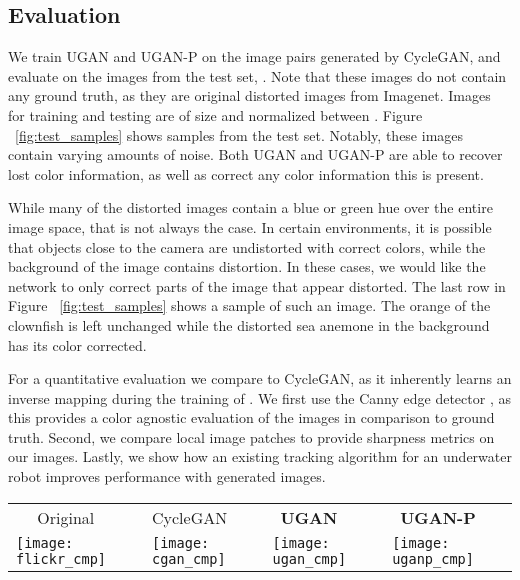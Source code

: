\subsection{Evaluation}
We train UGAN and UGAN-P on the image pairs generated by CycleGAN, and evaluate on the images from the
test set, . Note that these images do not contain any ground truth, as they are original distorted images from
Imagenet. Images for training and testing are of size  and normalized between .
Figure ~\ref{fig:test_samples} shows samples from the test set. Notably, these images contain varying amounts of noise. Both UGAN 
and UGAN-P
are able to recover lost color information, as well as correct any color information this is present. 

While many of the distorted images contain a blue or green hue over the entire image space, that is not always the case.
In certain environments,
it is possible that objects close to the camera are undistorted with correct colors, while the background
of the image contains distortion. In these cases, we would like the network to only correct parts of the image that
appear distorted. The last row in Figure ~\ref{fig:test_samples} shows a sample of such an image. The orange of the clownfish is 
left
unchanged while the distorted sea anemone in the background has its color corrected.

For a quantitative evaluation we compare to CycleGAN, as it inherently learns an inverse mapping during the training of
. We first use the Canny edge detector
\cite{canny1986computational}, as this provides a color agnostic evaluation of the images in comparison to ground truth.
Second, we compare local image patches to provide sharpness metrics on our images. Lastly, we show how an existing
tracking algorithm for an underwater robot improves performance with generated images.






\begin{figure*}[t]
\centering
\begin{tabular}{p{3.7cm} p{3.7cm} p{3.7cm} p{3.7cm}}
  
   \qquad \: \, ~ Original & \qquad \: \: CycleGAN & \qquad \: \: \, \textbf{UGAN} & \qquad \: \, \textbf{UGAN-P} \\

   \texttt{[image: flickr\_cmp]} &
   \texttt{[image: cgan\_cmp]} &
   \texttt{[image: ugan\_cmp]} &
   \texttt{[image: uganp\_cmp]} \\ [-2ex]
   
\end{tabular}
\end{figure*}

